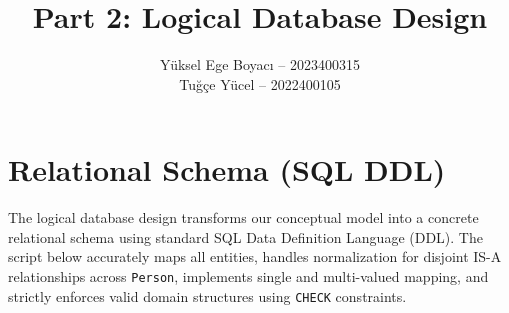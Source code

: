 \documentclass[12pt, a4paper]{article}
\title{\textbf{Part 2: Logical Database Design}}
\author{
    \begin{tabular}{c}
    Yüksel Ege Boyacı -- 2023400315 \\
    Tuğçe Yücel -- 2022400105
    \end{tabular}
}
\date{}
\begin{document}
\maketitle
\newpage
\tableofcontents
\newpage

\section{Relational Schema (SQL DDL)}

The logical database design transforms our conceptual model into a concrete relational schema using standard SQL Data Definition Language (DDL). The script below accurately maps all entities, handles normalization for disjoint IS-A relationships across \texttt{Person}, implements single and multi-valued mapping, and strictly enforces valid domain structures using \texttt{CHECK} constraints.

\vspace{0.5cm}
\end{document}

